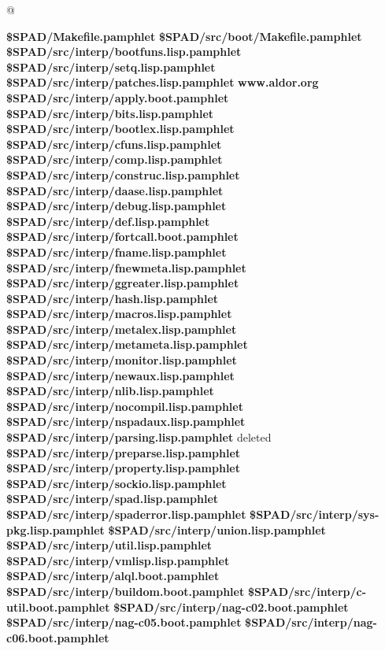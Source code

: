\documentclass{article}
\begin{document}
@
\eject
\begin{thebibliography}{99}
 {\bf \$SPAD/Makefile.pamphlet}
 {\bf \$SPAD/src/boot/Makefile.pamphlet}
 {\bf \$SPAD/src/interp/bootfuns.lisp.pamphlet}
 {\bf \$SPAD/src/interp/setq.lisp.pamphlet}
 {\bf \$SPAD/src/interp/patches.lisp.pamphlet}
 {\bf www.aldor.org}
 {\bf \$SPAD/src/interp/apply.boot.pamphlet}
 {\bf \$SPAD/src/interp/bits.lisp.pamphlet}
 {\bf \$SPAD/src/interp/bootlex.lisp.pamphlet}
 {\bf \$SPAD/src/interp/cfuns.lisp.pamphlet}
 {\bf \$SPAD/src/interp/comp.lisp.pamphlet}
 {\bf \$SPAD/src/interp/construc.lisp.pamphlet}
 {\bf \$SPAD/src/interp/daase.lisp.pamphlet}
 {\bf \$SPAD/src/interp/debug.lisp.pamphlet}
 {\bf \$SPAD/src/interp/def.lisp.pamphlet}
 {\bf \$SPAD/src/interp/fortcall.boot.pamphlet}
 {\bf \$SPAD/src/interp/fname.lisp.pamphlet}
 {\bf \$SPAD/src/interp/fnewmeta.lisp.pamphlet}
 {\bf \$SPAD/src/interp/ggreater.lisp.pamphlet}
 {\bf \$SPAD/src/interp/hash.lisp.pamphlet}
 {\bf \$SPAD/src/interp/macros.lisp.pamphlet}
 {\bf \$SPAD/src/interp/metalex.lisp.pamphlet}
 {\bf \$SPAD/src/interp/metameta.lisp.pamphlet}
 {\bf \$SPAD/src/interp/monitor.lisp.pamphlet}
 {\bf \$SPAD/src/interp/newaux.lisp.pamphlet}
 {\bf \$SPAD/src/interp/nlib.lisp.pamphlet}
 {\bf \$SPAD/src/interp/nocompil.lisp.pamphlet}
 {\bf \$SPAD/src/interp/nspadaux.lisp.pamphlet}
 {\bf \$SPAD/src/interp/parsing.lisp.pamphlet}
 {deleted}
 {\bf \$SPAD/src/interp/preparse.lisp.pamphlet}
 {\bf \$SPAD/src/interp/property.lisp.pamphlet}
 {\bf \$SPAD/src/interp/sockio.lisp.pamphlet}
 {\bf \$SPAD/src/interp/spad.lisp.pamphlet}
 {\bf \$SPAD/src/interp/spaderror.lisp.pamphlet}
 {\bf \$SPAD/src/interp/sys-pkg.lisp.pamphlet}
 {\bf \$SPAD/src/interp/union.lisp.pamphlet}
 {\bf \$SPAD/src/interp/util.lisp.pamphlet}
 {\bf \$SPAD/src/interp/vmlisp.lisp.pamphlet}
 {\bf \$SPAD/src/interp/alql.boot.pamphlet}
 {\bf \$SPAD/src/interp/buildom.boot.pamphlet}
 {\bf \$SPAD/src/interp/c-util.boot.pamphlet}
 {\bf \$SPAD/src/interp/nag-c02.boot.pamphlet}
 {\bf \$SPAD/src/interp/nag-c05.boot.pamphlet}
 {\bf \$SPAD/src/interp/nag-c06.boot.pamphlet}

\end{thebibliography}
\end{document}

